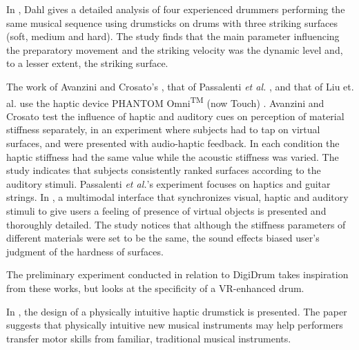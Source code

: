     In \cite{Dahl:2004}, Dahl gives a detailed analysis of four experienced drummers performing the same musical sequence using drumsticks on drums with three striking surfaces (soft, me\-dium and hard). The study finds that the main parameter influencing the preparatory movement and the striking velocity was the dynamic level and, to a lesser extent, the striking surface.
    
    The work of Avanzini and Crosato's \cite{avanzini2006}, that of Passalenti \emph{et al.}  \cite{passalenti2019}, and that of Liu et. al. use the haptic device PHANTOM\textregistered{} Omni\textsuperscript{TM} (now Touch) \cite{phantom}. Avanzini and Crosato test the influence of haptic and auditory cues on perception of material stiffness separately, in an experiment where subjects had to tap on virtual surfaces, and were presented with audio-haptic feedback. In each condition the haptic stiffness had the same value while the acoustic stiffness was varied. The study indicates that subjects consistently ranked surfaces according to the auditory stimuli.
    Passalenti \emph{et al.}'s experiment focuses on haptics and guitar strings. In \cite{Liu:2008}, a multimodal interface that synchronizes visual, haptic and auditory stimuli to give users a feeling of presence of virtual objects is presented and thoroughly detailed. The study notices that although the stiffness parameters of different materials were set to be the same, the sound effects biased user's judgment of the hardness of surfaces.
    
    The preliminary experiment conducted in relation to Digi\-Drum takes inspiration from these works, but looks at the specificity of a VR-enhanced drum.
    
    In \cite{Berdahl2007API}, the design of a physically intuitive haptic drumstick is presented. The paper suggests that physically intuitive new musical instruments may help performers transfer motor skills from familiar, traditional musical instruments. 
    
    
